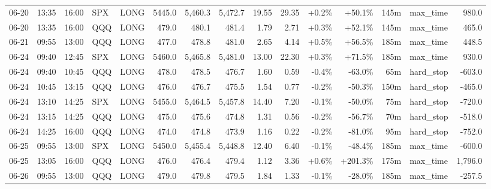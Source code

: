 \documentclass[11pt,a4paper,twoside]{article}
\begin{document}
\begin{landscape}
\begin{center}
\begin{longtable}{>{\color{txtmain}}l l l l l r r r r r r r r >{\color{txtmain}}l r}
06-20 & 13:35 & 16:00 & SPX & LONG & 5445.0 & 5,460.3 & 5,472.7 & 19.55 & 29.35 & \textcolor{wingreen}{+0.2\%} & \textcolor{wingreen}{+50.1\%} & 145m & max\_time & \textcolor{wingreen}{980.0} \\
06-20 & 13:35 & 16:00 & QQQ & LONG & 479.0 & 480.1 & 481.4 & 1.79 & 2.71 & \textcolor{wingreen}{+0.3\%} & \textcolor{wingreen}{+52.1\%} & 145m & max\_time & \textcolor{wingreen}{465.0} \\
06-21 & 09:55 & 13:00 & QQQ & LONG & 477.0 & 478.8 & 481.0 & 2.65 & 4.14 & \textcolor{wingreen}{+0.5\%} & \textcolor{wingreen}{+56.5\%} & 185m & max\_time & \textcolor{wingreen}{448.5} \\
06-24 & 09:40 & 12:45 & SPX & LONG & 5460.0 & 5,465.8 & 5,481.0 & 13.00 & 22.30 & \textcolor{wingreen}{+0.3\%} & \textcolor{wingreen}{+71.5\%} & 185m & max\_time & \textcolor{wingreen}{930.0} \\
06-24 & 09:40 & 10:45 & QQQ & LONG & 478.0 & 478.5 & 476.7 & 1.60 & 0.59 & \textcolor{lossred}{-0.4\%} & \textcolor{lossred}{-63.0\%} & 65m & hard\_stop & \textcolor{lossred}{-603.0} \\
06-24 & 10:45 & 13:15 & QQQ & LONG & 476.0 & 476.7 & 475.5 & 1.54 & 0.77 & \textcolor{lossred}{-0.2\%} & \textcolor{lossred}{-50.3\%} & 150m & hard\_stop & \textcolor{lossred}{-465.0} \\
06-24 & 13:10 & 14:25 & SPX & LONG & 5455.0 & 5,464.5 & 5,457.8 & 14.40 & 7.20 & \textcolor{lossred}{-0.1\%} & \textcolor{lossred}{-50.0\%} & 75m & hard\_stop & \textcolor{lossred}{-720.0} \\
06-24 & 13:15 & 14:25 & QQQ & LONG & 475.0 & 475.6 & 474.8 & 1.31 & 0.56 & \textcolor{lossred}{-0.2\%} & \textcolor{lossred}{-56.7\%} & 70m & hard\_stop & \textcolor{lossred}{-518.0} \\
06-24 & 14:25 & 16:00 & QQQ & LONG & 474.0 & 474.8 & 473.9 & 1.16 & 0.22 & \textcolor{lossred}{-0.2\%} & \textcolor{lossred}{-81.0\%} & 95m & hard\_stop & \textcolor{lossred}{-752.0} \\
06-25 & 09:55 & 13:00 & SPX & LONG & 5450.0 & 5,455.4 & 5,448.8 & 12.40 & 6.40 & \textcolor{lossred}{-0.1\%} & \textcolor{lossred}{-48.4\%} & 185m & max\_time & \textcolor{lossred}{-600.0} \\
06-25 & 13:05 & 16:00 & QQQ & LONG & 476.0 & 476.4 & 479.4 & 1.12 & 3.36 & \textcolor{wingreen}{+0.6\%} & \textcolor{wingreen}{+201.3\%} & 175m & max\_time & \textcolor{wingreen}{1,796.0} \\
06-26 & 09:55 & 13:00 & QQQ & LONG & 479.0 & 479.8 & 479.5 & 1.84 & 1.33 & \textcolor{lossred}{-0.1\%} & \textcolor{lossred}{-28.0\%} & 185m & max\_time & \textcolor{lossred}{-257.5} \\

\end{longtable}
\end{center}
\end{landscape}
\end{document}
